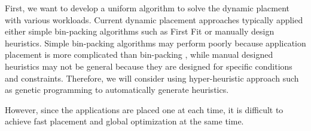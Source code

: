 First, we want to develop a uniform algorithm to solve the dynamic placment with various workloads. Current dynamic placement approaches typically applied either simple bin-packing algorithms such as First Fit or manually design heuristics. Simple bin-packing algorithms may perform poorly because application placement is more complicated than bin-packing \cite{Mann:2015ua}, while manual designed heuristics may not be general because they are designed for specific conditions and constraints\cite{Jung:2010dt}. Therefore, we will consider using hyper-heuristic approach such as genetic programming to automatically generate heuristics. 

However, since the applications are placed one at each time, it is difficult to achieve fast placement and global optimization at the same time.






